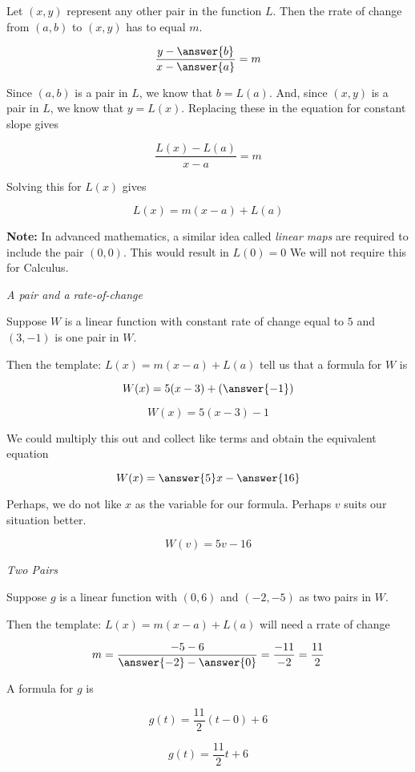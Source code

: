 \documentclass{ximera}
\begin{document}
Let $(x, y)$ represent any other pair in the function $L$. Then the rrate of change from $(a,b)$ to $(x, y)$ has to equal $m$.


\[  \frac{y - \answer{b}}{x-\answer{a}} = m \]

Since $(a, b)$ is a pair in $L$, we know that $b = L(a)$.  And, since $(x, y)$ is a pair in $L$, we know that $y = L(x)$.  Replacing these in the equation for constant slope gives


\[  \frac{L(x) - L(a)}{x-a} = m \]

Solving this for $L(x)$ gives

\[  L(x) = m (x-a) + L(a)     \]



\textbf{Note:} In advanced mathematics, a similar idea called \textit{linear maps} are required to include the pair $(0,0)$.  This would result in $L(0) = 0$  We will not require this for Calculus.




\begin{example} \textit{A pair and a rate-of-change}


Suppose $W$ is a linear function with constant rate of change equal to $5$ and $(3, -1)$ is one pair in $W$.

Then the template: $L(x) = m (x-a) + L(a)$ tell us that a formula for $W$ is 


\[  W(x) = 5 (x-3) + \left(\answer{-1}\right)     \]


\[  W(x) = 5 (x-3) - 1     \]

We could multiply this out and collect like terms and obtain the equivalent equation


\[  W(x) = \answer{5}x - \answer{16}   \]


Perhaps, we do not like $x$ as the variable for our formula.  Perhaps $v$ suits our situation better.

\[  W(v) = 5v - 16   \]

\end{example}









\begin{example} \textit{Two Pairs}


Suppose $g$ is a linear function with $(0, 6)$ and $(-2, -5)$ as two pairs in $W$.

Then the template: $L(x) = m (x-a) + L(a)$ will need a rrate of change



\[  m = \frac{-5 - 6}{\answer{-2} - \answer{0}} = \frac{-11}{-2} = \frac{11}{2}  \]

A formula for $g$ is


\[  g(t) = \frac{11}{2} (t-0) + 6     \]


\[  g(t) = \frac{11}{2} t + 6    \]



\end{example}
\end{document}

